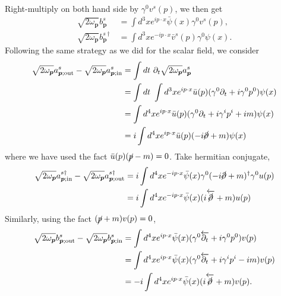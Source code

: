 Right-multiply on both hand side by $\gamma^0 v^{s}(p)$, we then get
\begin{equation*}
\begin{aligned}
	\sqrt{2\omega_{\bm p}}b^{s}_{\bm p} &= \int d^3 x e^{ip\cdot x}\bar\psi(x)\gamma^0 v^s(p), \\
	\sqrt{2\omega_{\bm p}}b^{s \dagger}_{\bm p} &= \int d^3 x e^{-ip\cdot x}\bar v^s(p)\gamma^0 \psi(x).
\end{aligned}
\end{equation*}
Following the same strategy as we did for the scalar field, we consider
\begin{equation*}
\begin{aligned}
	\sqrt{2\omega_{\bm p}}a^{s}_{\bm p;\mathrm{out}} - 
	\sqrt{2\omega_{\bm p}}a^{s}_{\bm p;\mathrm{in}} 
	&= \int dt\ \partial_t \sqrt{2\omega_{\bm p}}a^s_{\bm p} \\
	&= \int dt\ \int d^3x e^{ip\cdot x}\bar u(p)(\gamma^0 \partial_t +i\gamma^0 p^0)\psi(x) \\
	&= \int d^4x e^{ip\cdot x}\bar u(p)(\gamma^0 \partial_t +i\gamma^i p^i +i m)\psi(x) \\ 
	&= i\int d^4x e^{ip\cdot x}\bar u(p)(-i\cancel\partial + m)\psi(x)
\end{aligned}
\end{equation*}
where we have used the fact $\bar u(p) (\cancel p - m) = 0$.
Take hermitian conjugate,
\begin{equation*}
\begin{aligned}
	\sqrt{2\omega_{\bm p}}a^{s \dagger}_{\bm p;\mathrm{in}} - 
	\sqrt{2\omega_{\bm p}}a^{s \dagger}_{\bm p;\mathrm{out}} 
	&= i\int d^4x e^{-ip\cdot x}\bar\psi(x)\gamma^0(-i\cancel\partial + m)^\dagger \gamma^0 u(p) \\
	&= i\int d^4x e^{-ip\cdot x}\bar\psi(x)(i \overleftarrow{\cancel\partial} + m) u(p)
\end{aligned}
\end{equation*}
Similarly, using the fact $(\cancel p + m)v(p) =0$,
\begin{equation*}
\begin{aligned}
	\sqrt{2\omega_{\bm p}}b^{s}_{\bm p;\mathrm{out}} - 
	\sqrt{2\omega_{\bm p}}b^{s}_{\bm p;\mathrm{in}} 
	&= \int d^4x e^{ip\cdot x}\bar\psi(x)(\gamma^0 \overleftarrow{\partial_t} +i\gamma^0 p^0)v(p) \\
	&= \int d^4x e^{ip\cdot x}\bar\psi(x)(\gamma^0 \overleftarrow{\partial_t} +i\gamma^i p^i -i m)v(p) \\ 
	&= -i\int d^4x e^{ip\cdot x}\bar\psi(x)(i\overleftarrow{\cancel\partial} + m)v(p).
\end{aligned}
\end{equation*}
